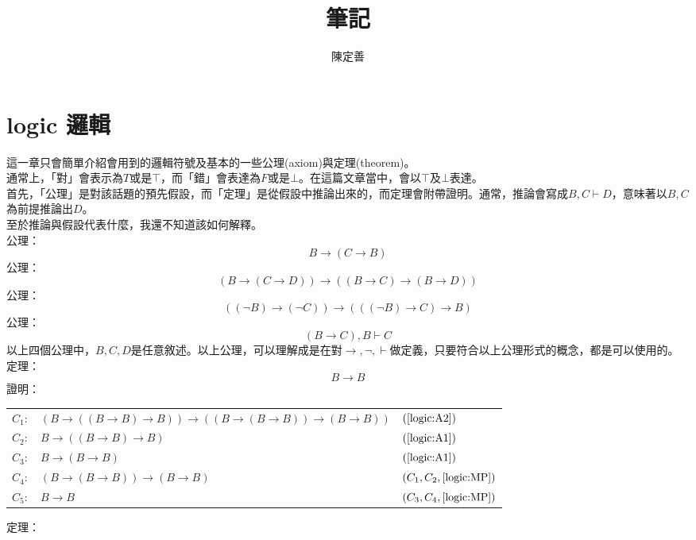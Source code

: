 \documentclass{article}
\title{筆記}
\author{陳定善}
\date{}
\newcommand{\sd}[1]{{\left(#1\right)}}
\newcommand{\thm}{定理：}
\newcommand{\axm}{公理：}
\newcommand{\pf}{證明：}
\begin{document}
\maketitle
\section{logic 邏輯}
這一章只會簡單介紹會用到的邏輯符號及基本的一些公理(axiom)與定理(theorem)。\\
通常上，「對」會表示為$T$或是$\top$，而「錯」會表達為$F$或是$\bot$。在這篇文章當中，會以$\top$及$\bot$表達。\\
首先，「公理」是對該話題的預先假設，而「定理」是從假設中推論出來的，而定理會附帶證明。通常，推論會寫成$B,C\vdash D$，意味著以$B, C$為前提推論出$D$。\\
至於推論與假設代表什麼，我還不知道該如何解釋。\\
\axm
\begin{equation}\label{logic:A1}
	B \to \sd{C \to B}
\end{equation}
\axm
\begin{equation}\label{logic:A2}
	\sd{B \to \sd{C \to D}} \to \sd{\sd{B \to C} \to \sd{B \to D}}
\end{equation}
\axm
\begin{equation}\label{logic:A3}
	\sd{\sd{\lnot B} \to \sd{\lnot C}} \to \sd{\sd{\sd{\lnot B}\to C}\to B}
\end{equation}
\axm
\begin{equation}\label{logic:MP}\tag{MP}
	\sd{B \to C}, B \vdash C
\end{equation}
以上四個公理中，$B,C,D$是任意敘述。以上公理，可以理解成是在對$\to,\lnot,\vdash$做定義，只要符合以上公理形式的概念，都是可以使用的。\\
\thm
\begin{equation}\label{logic:to_self}
	B \to B
\end{equation}
\pf\\
\begin{tabular}{ >{\raggedright\arraybackslash}p{}  >{\centering\arraybackslash}p{} >{\raggedleft\arraybackslash}p{}}
$C_{1}:$&$\sd{B \to \sd{\sd{B \to B}\to B}} \to \sd{\sd{B \to \sd{B \to B}} \to \sd{B \to B}}$&$(\ref{logic:A2})$\\
$C_{2}:$&$B \to \sd{\sd{B \to B} \to B}$&$(\ref{logic:A1})$\\
$C_{3}:$&$B \to \sd{B \to B}$&$(\ref{logic:A1})$\\
$C_{4}:$&$\sd{B \to \sd{B \to B}} \to \sd{B \to B}$&$(C_{1}, C_{2}, \ref{logic:MP})$\\
$C_{5}:$&$B \to B$&$(C_{3},C_{4},\ref{logic:MP})$\\
\end{tabular}
\thm
\end{document}
